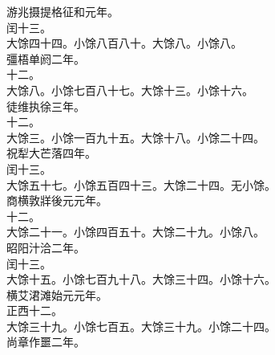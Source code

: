 \documentclass{zhvt-classic}
\begin{document}
\hspace*{2em}游兆摄提格征和元年。\\
\hspace*{2em}闰十三。\\
\hspace*{2em}大馀四十四。小馀八百八十。大馀八。小馀八。\\
\hspace*{2em}彊梧单阏二年。\\
\hspace*{2em}十二。\\
\hspace*{2em}大馀八。小馀七百八十七。大馀十三。小馀十六。\\
\hspace*{2em}徒维执徐三年。\\
\hspace*{2em}十二。\\
\hspace*{2em}大馀三。小馀一百九十五。大馀十八。小馀二十四。\\
\hspace*{2em}祝犁大芒落四年。\\
\hspace*{2em}闰十三。\\
\hspace*{2em}大馀五十七。小馀五百四十三。大馀二十四。无小馀。\\
\hspace*{2em}商横敦牂後元元年。\\
\hspace*{2em}十二。\\
\hspace*{2em}大馀二十一。小馀四百五十。大馀二十九。小馀八。\\
\hspace*{2em}昭阳汁洽二年。\\
\hspace*{2em}闰十三。\\
\hspace*{2em}大馀十五。小馀七百九十八。大馀三十四。小馀十六。\\
\hspace*{2em}横艾涒滩始元元年。\\
\hspace*{2em}正西十二。\\
\hspace*{2em}大馀三十九。小馀七百五。大馀三十九。小馀二十四。\\
\hspace*{2em}尚章作噩二年。\\
\end{document}

